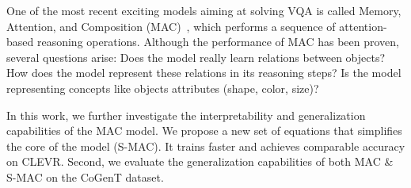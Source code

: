 One of the most recent exciting models aiming at solving VQA is called Memory, Attention, and Composition (MAC)~\citep{hudson2018compositional}, which performs a sequence of attention-based reasoning operations. 
Although the performance of MAC has been proven, 
several questions arise:
Does the model really learn relations between objects? 
How does the model represent these relations in its reasoning steps? 
Is the model representing concepts like objects attributes (shape, color, size)?

In this work, we further investigate the interpretability and generalization capabilities of the MAC model.
We propose a new set of equations that simplifies the core of the model (S-MAC). It trains faster and achieves comparable accuracy on CLEVR. 
Second, we evaluate the generalization capabilities of both MAC \& S-MAC on the CoGenT dataset. 
